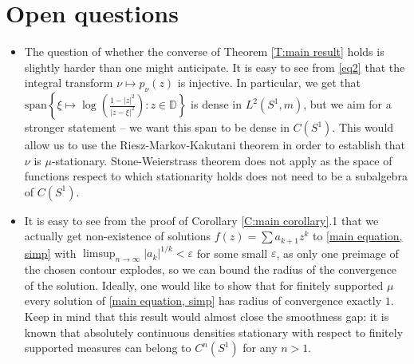 \documentclass[11pt]{article}
\begin{document}
\section{Open questions}
\begin{itemize}
	\item The question of whether the converse of Theorem \ref{T:main result} holds is slightly harder than one might anticipate. It is easy to see from \eqref{eq2} that the integral transform $\nu \mapsto p_\nu(z)$ is injective. In particular, we get that $\text{span} \left\lbrace  \xi \mapsto \log\left( \frac{1 - |z|^2}{|z - \xi|^2} \right) : z \in \mathbb{D} \right\rbrace $ is dense in $L^2(S^1, m)$, but we aim for a stronger statement -- we want this span to be dense in $C(S^1)$. This would allow us to use the Riesz-Markov-Kakutani theorem in order to establish that $\nu$ is $\mu$-stationary. Stone-Weierstrass theorem does not apply as the space of functions respect to which stationarity holds does not need to be a subalgebra of $C(S^1)$.
	\item It is easy to see from the proof of Corollary \ref{C:main corollary}.1 that we actually get non-existence of solutions $f(z) = \sum a_{k+1} z^k$ to \eqref{main equation, simp} with $\limsup_{n \rightarrow \infty} |a_k|^{1/k} < \varepsilon$ for some small $\varepsilon$, as only one preimage of the chosen contour explodes, so we can bound the radius of the convergence of the solution. Ideally, one would like to show that for finitely supported $\mu$ every solution of \eqref{main equation, simp} has radius of convergence exactly $1$. Keep in mind that this result would almost close the smoothness gap: it is known that absolutely continuous densities stationary with respect to finitely supported measures can belong to $C^n(S^1)$ for any $n > 1$. 
	

\end{itemize}
\end{document}
